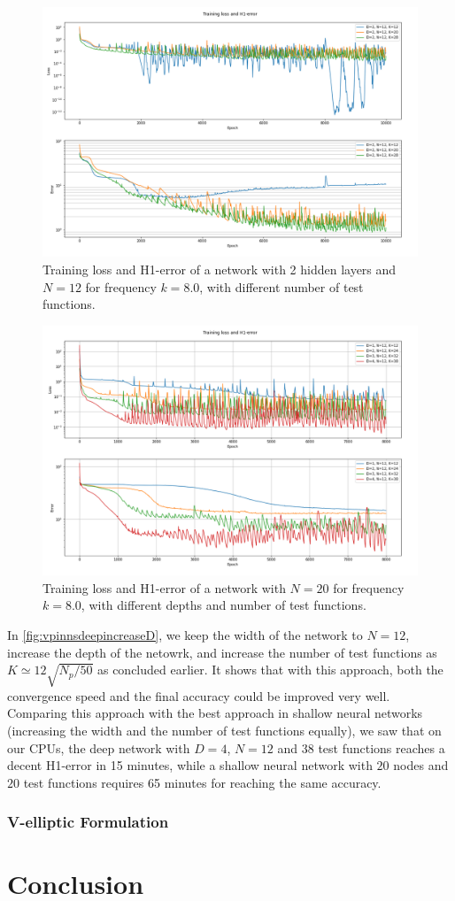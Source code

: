 \begin{figure}[h!]
    \centering
    \includegraphics[width=.7\textwidth]{img/VPINN-Deep-Comparison-k8increaseK.png}
    \caption{Training loss and H1-error of a network with 2 hidden layers and $N=12$ for frequency $k=8.0$, with different number of test functions.}
    \label{fig:vpinnsdeepincreaseK}
\end{figure}

\begin{figure}[h!]
    \centering
    \includegraphics[width=.7\textwidth]{img/VPINN-Deep-Comparison-k8increaseD.png}
    \caption{Training loss and H1-error of a network with $N=20$ for frequency $k=8.0$, with different depths and number of test functions.}
    \label{fig:vpinnsdeepincreaseD}
\end{figure}

In \autoref{fig:vpinnsdeepincreaseD}, we keep the width of the network to $N=12$, increase the depth of the netowrk, and increase the number of test functions as $K \simeq 12\sqrt{N_p/50}$ as concluded earlier. It shows that with this approach, both the convergence speed and the final accuracy could be improved very well. Comparing this approach with the best approach in shallow neural networks (increasing the width and the number of test functions equally), we saw that on our CPUs, the deep network with $D=4$, $N=12$ and 38 test functions reaches a decent H1-error in 15 minutes, while a shallow neural network with $20$ nodes and $20$ test functions requires 65 minutes for reaching the same accuracy.

\subsubsection{V-elliptic Formulation}\label{seq:velliptic}


\section{Conclusion}\label{sec:conclusion}
